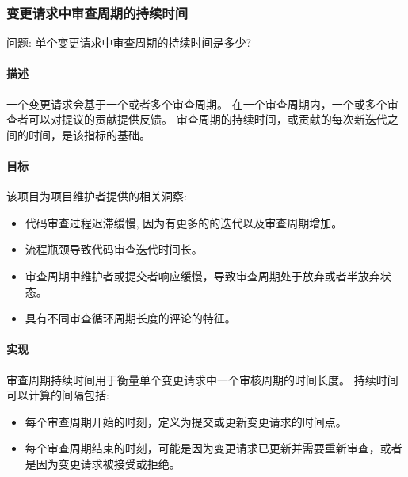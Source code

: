 \hypertarget{ux53d8ux66f4ux8bf7ux6c42ux4e2dux5ba1ux67e5ux5468ux671fux7684ux6301ux7eedux65f6ux95f4}{%
\subsubsection{变更请求中审查周期的持续时间}\label{ux53d8ux66f4ux8bf7ux6c42ux4e2dux5ba1ux67e5ux5468ux671fux7684ux6301ux7eedux65f6ux95f4}}

问题: 单个变更请求中审查周期的持续时间是多少?

\hypertarget{ux63cfux8ff0}{%
\paragraph{描述}\label{ux63cfux8ff0}}

一个变更请求会基于一个或者多个审查周期。
在一个审查周期内，一个或多个审查者可以对提议的贡献提供反馈。
审查周期的持续时间，或贡​​献的每次新迭代之间的时间，是该指标的基础。

\hypertarget{ux76eeux6807}{%
\paragraph{目标}\label{ux76eeux6807}}

该项目为项目维护者提供的相关洞察:

\begin{itemize}
\tightlist
\item
  代码审查过程迟滞缓慢, 因为有更多的的迭代以及审查周期增加。
\item
  流程瓶颈导致代码审查迭代时间长。
\item
  审查周期中维护者或提交者响应缓慢，导致审查周期处于放弃或者半放弃状态。
\item
  具有不同审查循环周期长度的评论的特征。
\end{itemize}

\hypertarget{ux5b9eux73b0}{%
\paragraph{实现}\label{ux5b9eux73b0}}

审查周期持续时间用于衡量单个变更请求中一个审核周期的时间长度。
持续时间可以计算的间隔包括:

\begin{itemize}
\tightlist
\item
  每个审查周期开始的时刻，定义为提交或更新变更请求的时间点。
\item
  每个审查周期结束的时刻，可能是因为变更请求已更新并需要重新审查，或者是因为变更请求被接受或拒绝。
\end{itemize}

